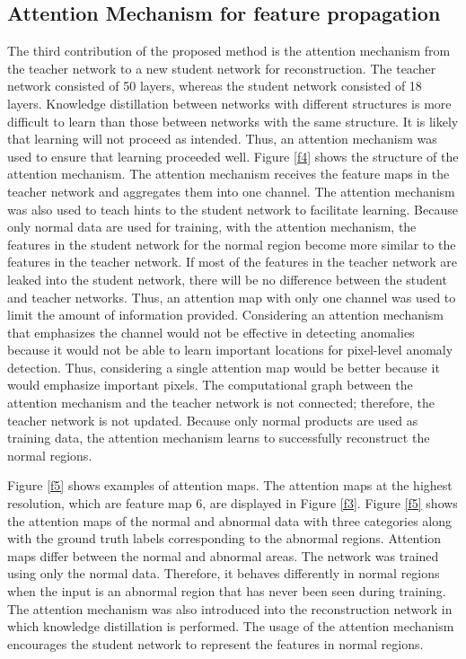 \documentclass[letterpaper, 10 pt, conference]{ieeeconf}
\begin{document}
\subsection{Attention Mechanism for feature propagation} 

The third contribution of the proposed method is the attention mechanism from the teacher network to a new student network for reconstruction. The teacher network consisted of 50 layers, whereas the student network consisted of 18 layers. Knowledge distillation between networks with different structures is more difficult to learn than those between networks with the same structure\cite{c37}. It is likely that learning will not proceed as intended. Thus, an attention mechanism was used to ensure that learning proceeded well. Figure \ref{f4} shows the structure of the attention mechanism. The attention mechanism receives the feature maps in the teacher network and aggregates them into one channel. The attention mechanism was also used to teach hints to the student network to facilitate learning. Because only normal data are used for training, with the attention mechanism, the features in the student network for the normal region become more similar to the features in the teacher network. If most of the features in the teacher network are leaked into the student network, there will be no difference between the student and teacher networks. Thus, an attention map with only one channel was used to limit the amount of information provided. Considering an attention mechanism that emphasizes the channel would not be effective in detecting anomalies because it would not be able to learn important locations for pixel-level anomaly detection. Thus, considering a single attention map would be better because it would emphasize important pixels. The computational graph between the attention mechanism and the teacher network is not connected; therefore, the teacher network is not updated. Because only normal products are used as training data, the attention mechanism learns to successfully reconstruct the normal regions.


Figure \ref{f5} shows examples of attention maps. The attention maps at the highest resolution, which are feature map 6, are displayed in Figure \ref{f3}. Figure \ref{f5} shows the attention maps of the normal and abnormal data with three categories along with the ground truth labels corresponding to the abnormal regions. Attention maps differ between the normal and abnormal areas. The network was trained using only the normal data. Therefore, it behaves differently in normal regions when the input is an abnormal region that has never been seen during training. The attention mechanism was also introduced into the reconstruction network in which knowledge distillation is performed. The usage of the attention mechanism encourages the student network to represent the features in normal regions.
\end{document}
